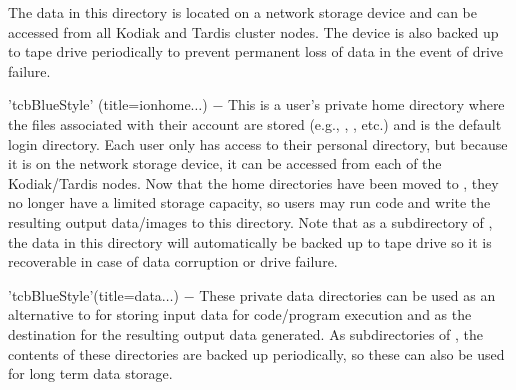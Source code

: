 \begin{tcbenvironment}
\begin{tcbparagraph}
\indent\indent The data in this directory is located on a network storage device and can be accessed from all Kodiak and Tardis cluster nodes.  The device is also backed up to tape drive periodically to prevent permanent loss of data in the event of drive failure.
\end{tcbparagraph}
\begin{tcbparagraph}'tcbBlueStyle'%
(title=\dirsep ion\dirsep home\dirsep{}\dirsep$\dots$)
$\boldsymbol{-}$ This is a user's private home directory where the files associated with their account are stored (e.g., , , etc.) and is the default login directory.  Each user only has access to their personal directory, but because it is on the network storage device, it can be accessed from each of the Kodiak/Tardis nodes. Now that the home directories have been moved to , they no longer have a limited storage capacity, so users may run code and write the resulting output data/images to this directory.  Note that as a subdirectory of , the data in this directory will automatically be backed up to tape drive so it is recoverable in case of data corruption or drive failure.
\end{tcbparagraph}
\begin{tcbparagraph}'tcbBlueStyle'(title=\dirsep data\dirsep{}\dirsep$\dots$)
$\boldsymbol{-}$ These private data directories can be used as an alternative to  for storing input data for code/program execution and as the destination for the resulting output data generated.  As subdirectories of , the contents of these directories are backed up periodically, so these can also be used for long term data storage.

\end{tcbparagraph}
\end{tcbenvironment}
